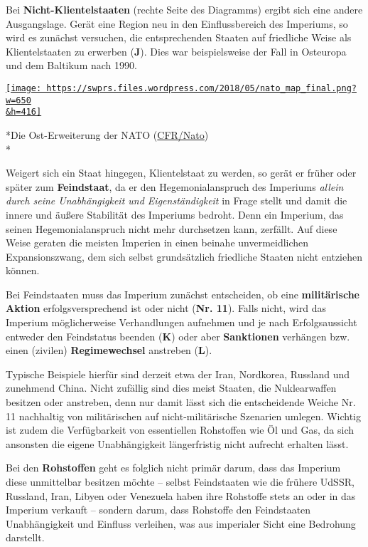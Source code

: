 Bei \textbf{Nicht-Klientelstaaten} (rechte Seite des Diagramms) ergibt
sich eine andere Ausgangslage. Gerät eine Region neu in den
Einflussbereich des Imperiums, so wird es zunächst versuchen, die
entsprechenden Staaten auf friedliche Weise als Klientelstaaten zu
erwerben (\textbf{J}). Dies war beispielsweise der Fall in Osteuropa und
dem Baltikum nach 1990.

\href{https://swprs.files.wordpress.com/2018/05/nato_map_final.png}{\texttt{[image: https://swprs.files.wordpress.com/2018/05/nato\_map\_final.png?w=650\\\&h=416]}}

*Die Ost-Erweiterung der NATO
(\href{https://www.cfr.org/backgrounder/north-atlantic-treaty-organization-nato}{CFR/Nato})\\
*

Weigert sich ein Staat hingegen, Klientelstaat zu werden, so gerät er
früher oder später zum \textbf{Feindstaat}, da er den Hegemonialanspruch
des Imperiums \emph{allein durch seine Unabhängigkeit und
Eigenständigkeit} in Frage stellt und damit die innere und äußere
Stabilität des Imperiums bedroht. Denn ein Imperium, das seinen
Hegemonialanspruch nicht mehr durchsetzen kann, zerfällt. Auf diese
Weise geraten die meisten Imperien in einen beinahe unvermeidlichen
Expansionszwang, dem sich selbst grundsätzlich friedliche Staaten nicht
entziehen können.

Bei Feindstaaten muss das Imperium zunächst entscheiden, ob eine
\textbf{militärische Aktion} erfolgsversprechend ist oder nicht
(\textbf{Nr. 11}). Falls nicht, wird das Imperium möglicherweise
Verhandlungen aufnehmen und je nach Erfolgsaussicht entweder den
Feindstatus beenden (\textbf{K}) oder aber \textbf{Sanktionen} verhängen
bzw. einen (zivilen) \textbf{Regimewechsel} anstreben (\textbf{L}).

Typische Beispiele hierfür sind derzeit etwa der Iran, Nordkorea,
Russland und zunehmend China. Nicht zufällig sind dies meist Staaten,
die Nuklearwaffen besitzen oder anstreben, denn nur damit lässt sich die
entscheidende Weiche Nr. 11 nachhaltig von militärischen auf
nicht-militärische Szenarien umlegen. Wichtig ist zudem die
Verfügbarkeit von essentiellen Rohstoffen wie Öl und Gas, da sich
ansonsten die eigene Unabhängigkeit längerfristig nicht aufrecht
erhalten lässt.

Bei den \textbf{Rohstoffen} geht es folglich nicht primär darum, dass
das Imperium diese unmittelbar besitzen möchte -- selbst Feindstaaten
wie die frühere UdSSR, Russland, Iran, Libyen oder Venezuela haben ihre
Rohstoffe stets an oder in das Imperium verkauft -- sondern darum, dass
Rohstoffe den Feind­staa­ten Unabhängigkeit und Einfluss verleihen, was
aus imperialer Sicht eine Bedrohung darstellt.


